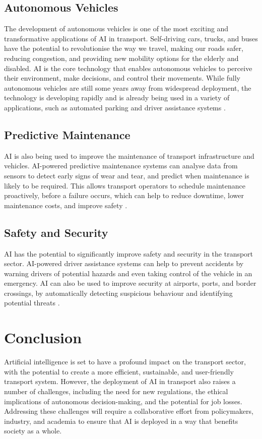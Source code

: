 \subsection{Autonomous Vehicles}

The development of autonomous vehicles is one of the most exciting and transformative applications of AI in transport. Self-driving cars, trucks, and buses have the potential to revolutionise the way we travel, making our roads safer, reducing congestion, and providing new mobility options for the elderly and disabled. AI is the core technology that enables autonomous vehicles to perceive their environment, make decisions, and control their movements. While fully autonomous vehicles are still some years away from widespread deployment, the technology is developing rapidly and is already being used in a variety of applications, such as automated parking and driver assistance systems \parencite{ma2020review}.

\subsection{Predictive Maintenance}

AI is also being used to improve the maintenance of transport infrastructure and vehicles. AI-powered predictive maintenance systems can analyse data from sensors to detect early signs of wear and tear, and predict when maintenance is likely to be required. This allows transport operators to schedule maintenance proactively, before a failure occurs, which can help to reduce downtime, lower maintenance costs, and improve safety \parencite{abduljabbar2019applications}.

\subsection{Safety and Security}

AI has the potential to significantly improve safety and security in the transport sector. AI-powered driver assistance systems can help to prevent accidents by warning drivers of potential hazards and even taking control of the vehicle in an emergency. AI can also be used to improve security at airports, ports, and border crossings, by automatically detecting suspicious behaviour and identifying potential threats \parencite{isalkar2024artificial}.

\section{Conclusion}

Artificial intelligence is set to have a profound impact on the transport sector, with the potential to create a more efficient, sustainable, and user-friendly transport system. However, the deployment of AI in transport also raises a number of challenges, including the need for new regulations, the ethical implications of autonomous decision-making, and the potential for job losses. Addressing these challenges will require a collaborative effort from policymakers, industry, and academia to ensure that AI is deployed in a way that benefits society as a whole.